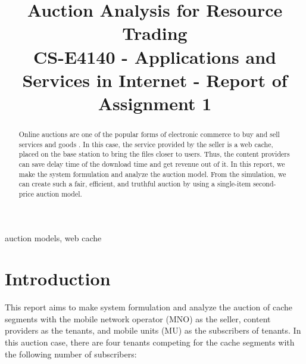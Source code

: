 \documentclass[conference]{IEEEtran}
\begin{document}
\title{Auction Analysis for Resource Trading \\ {\large CS-E4140 - Applications and Services in Internet - Report of Assignment 1 }}

\author{
\and
{}
}

\maketitle
\thispagestyle{plain}
\pagestyle{plain}

\begin{abstract}
Online auctions are one of the popular forms of electronic commerce to buy and sell services and goods \cite{akula2004analysis}.
In this case, the service provided by the seller is a web cache, placed on the base station to bring the files closer to users.
Thus, the content providers can save delay time of the download time and get revenue out of it.
In this report, we make the system formulation and analyze the auction model.
From the simulation, we can create such a fair, efficient, and truthful auction by using a single-item second-price auction model. 
\end{abstract}

\begin{IEEEkeywords}
auction models, web cache 
\end{IEEEkeywords}

\section{Introduction}\label{sec:intro}
This report aims to make system formulation and analyze the auction of cache segments with the mobile network operator (MNO) as the seller, content providers as the tenants, and mobile units (MU) as the subscribers of tenants. In this auction case, there are four tenants competing for the cache segments with the following number of subscribers:
\end{document}

